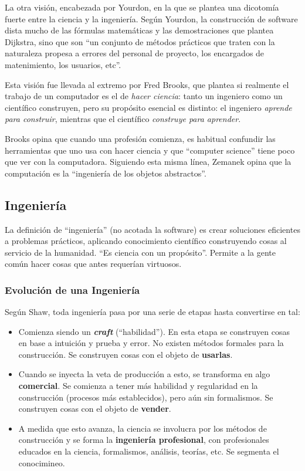 \documentclass[]{article}
\begin{document}
La otra visión, encabezada por Yourdon, en la que se plantea una dicotomía fuerte entre la ciencia y la ingeniería. Según Yourdon, la construcción de software dista mucho de las fórmulas matemáticas y las demostraciones que plantea Dijkstra, sino que son ``un conjunto de métodos prácticos que traten con la naturaleza propesa a errores del personal de proyecto, los encargados de matenimiento, los usuarios, etc''.

Esta visión fue llevada al extremo por Fred Brooks, que plantea si realmente el trabajo de un computador es el de \emph{hacer ciencia}: tanto un ingeniero como un científico construyen, pero su propósito esencial es distinto: el ingeniero \emph{aprende para construir}, mientras que el científico \emph{construye para aprender}.

Brooks opina que cuando una profesión comienza, es habitual confundir las herramientas que uno usa con hacer ciencia y que ``computer science'' tiene poco que ver con la computadora. Siguiendo esta misma línea, Zemanek opina que la computación es la ``ingeniería de los objetos abstractos''.

\subsection{Ingeniería}

La definición de ``ingeniería'' (no acotada la software) es crear soluciones eficientes a problemas prácticos, aplicando conocimiento científico construyendo cosas al servicio de la humanidad. ``Es ciencia con un propósito''. Permite a la gente común hacer cosas que antes requerían virtuosos.

\subsubsection{Evolución de una Ingeniería}

Según Shaw, toda ingeniería pasa por una serie de etapas hasta convertirse en tal:
\begin{itemize}
	\item Comienza siendo un \emph{\textbf{craft}} (``habilidad''). En esta etapa se construyen cosas en base a intuición y prueba y error. No existen métodos formales para la construcción. Se construyen cosas con el objeto de \textbf{usarlas}.
	\item Cuando se inyecta la veta de producción a esto, se transforma en algo \textbf{comercial}. Se comienza a tener más habilidad y regularidad en la construcción (procesos más establecidos), pero aún sin formalismos. Se construyen cosas con el objeto de \textbf{vender}.
	\item A medida que esto avanza, la ciencia se involucra por los métodos de construcción y se forma la \textbf{ingeniería profesional}, con profesionales educados en la ciencia, formalismos, análisis, teorías, etc. Se segmenta el conocimineo.
\end{itemize}
\end{document}
